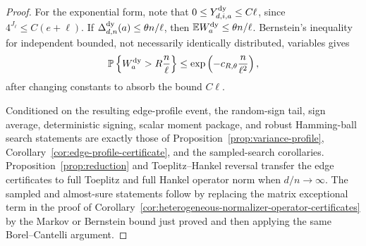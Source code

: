\documentclass[11pt]{amsart}
\numberwithin{equation}{section}
\theoremstyle{definition}
\theoremstyle{remark}
\newcommand{\Prob}{\mathbb P}
\newcommand{\Exp}{\mathbb E}
\begin{document}
\begin{proof}
For the exponential form, note that \(0\le Y_{d,i,a}^{\rm dy}\le C\ell\), since
\(4^{J_\ell}\le C(e+\ell)\).  If
\(\Delta_{d,n}^{\rm dy}(a)\le\theta n/\ell\), then
\(\Exp W_a^{\rm dy}\le\theta n/\ell\).  Bernstein's inequality for independent
bounded, not necessarily identically distributed, variables gives
\[
  \Prob\left\{W_a^{\rm dy}>R\frac n\ell\right\}
  \le
  \exp\left(-c_{R,\theta}\frac n{\ell^2}\right),
\]
after changing constants to absorb the bound \(C\ell\).

Conditioned on the resulting edge-profile event, the random-sign tail, sign
average, deterministic signing, scalar moment package, and robust Hamming-ball
search statements are exactly those of
Proposition~\ref{prop:variance-profile},
Corollary~\ref{cor:edge-profile-certificate}, and the sampled-search
corollaries.  Proposition~\ref{prop:reduction} and Toeplitz--Hankel reversal
transfer the edge certificates to full Toeplitz and full Hankel operator norm
when \(d/n\to\infty\).  The sampled and almost-sure statements follow by
replacing the matrix exceptional term in the proof of
Corollary~\ref{cor:heterogeneous-normalizer-operator-certificates} by the
Markov or Bernstein bound just proved and then applying the same
Borel--Cantelli argument.
\end{proof}
\end{document}
